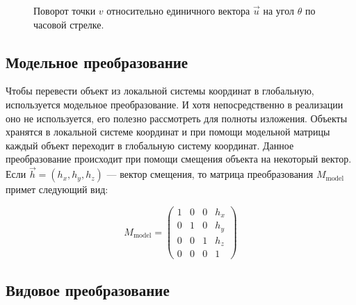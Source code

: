 \documentclass{article}
\begin{document}
\begin{figure}[ht]
	\caption{Поворот точки $v$ относительно единичного вектора $\vec{u}$ на угол $\theta$ по часовой стрелке.}
	\label{rotation}
\end{figure}

\subsection{Модельное преобразование}

Чтобы перевести объект из локальной системы координат в глобальную, используется модельное преобразование.
И хотя непосредственно в реализации оно не используется, его полезно рассмотреть для полноты изложения.
Объекты хранятся в локальной системе координат и при помощи модельной матрицы каждый объект переходит в глобальную систему координат.
Данное преобразование происходит при помощи смещения объекта на некоторый вектор.
Если $\vec{h} = (h_{x}, h_{y}, h_{z})$ --- вектор смещения, то матрица преобразования $M_{\text{model}}$ примет следующий вид:

\begin{equation*}
	M_{\text{model}} =
		\begin{pmatrix}
			1 & 0 & 0 & h_{x} \\
			0 & 1 & 0 & h_{y} \\
			0 & 0 & 1 & h_{z} \\
			0 & 0 & 0 & 1
		\end{pmatrix}
\end{equation*}

\subsection{Видовое преобразование} \label{view transform section}
\end{document}
